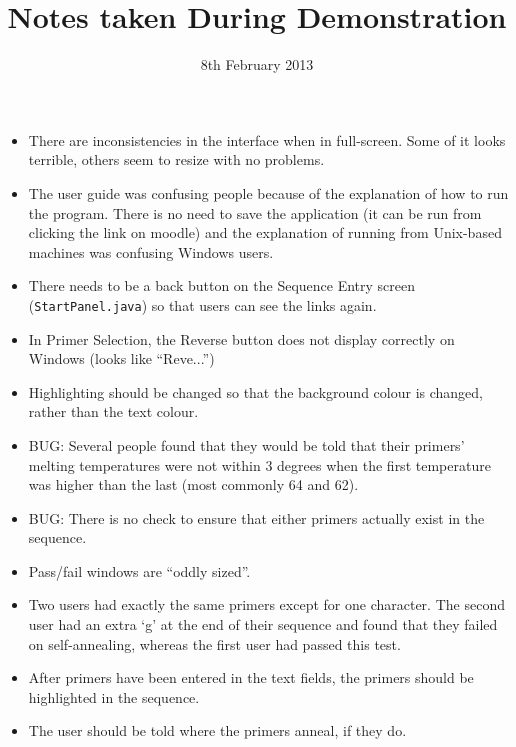 \documentclass[a4paper]{article}
\title{Notes taken During Demonstration}
\date{8th February 2013}
\begin{document}
\maketitle

\begin{itemize}

  \item{
    There are inconsistencies in the interface when in
    full-screen. Some of it looks terrible, others seem to resize with
    no problems.
  }
  \item{
    The user guide was confusing people because of the explanation of
    how to run the program.
    There is no need to save the application (it can be run from
    clicking the link on moodle) and the explanation of running from
    Unix-based machines was confusing Windows users.
  }
  \item{
    There needs to be a back button on the Sequence Entry screen
    (\texttt{StartPanel.java}) so that users can see the links again.
  }
  \item{
    In Primer Selection, the Reverse button does not display correctly
    on Windows (looks like ``Reve...'')
  }
  \item{
    Highlighting should be changed so that the background colour is
    changed, rather than the text colour.
  }
  \item{
    BUG: Several people found that they would be told that their
    primers' melting temperatures were not within 3 degrees when the
    first temperature was higher than the last (most commonly 64 and 62).
  }
  \item{
    BUG: There is no check to ensure that either primers actually
    exist in the sequence.
  }
  \item{
    Pass/fail windows are ``oddly sized''.
  }
  \item{
    Two users had exactly the same primers except for one
    character. The second user had an extra `g' at the end of their
    sequence and found that they failed on self-annealing, whereas the
    first user had passed this test. 
  }
  \item{
    After primers have been entered in the text fields, the primers
    should be highlighted in the sequence.
  }
  \item{
    The user should be told where the primers anneal, if they do.
  }
\end{itemize}
\end{document}
